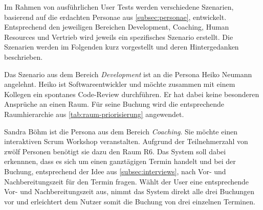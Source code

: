 Im Rahmen von ausführlichen User Tests werden verschiedene Szenarien, basierend auf die erdachten Personae aus \ref{subsec:personae}, entwickelt. Entsprechend den jeweiligen Bereichen Development, Coaching, Human Resources und Vertrieb wird jeweils ein spezifisches Szenario erstellt. Die Szenarien werden im Folgenden kurz vorgestellt und deren Hintergedanken beschrieben.

Das Szenario aus dem Bereich \textit{Development} ist an die Persona Heiko Neumann angelehnt. Heiko ist Softwareentwickler und möchte zusammen mit einem Kollegen ein spontanes Code-Review durchführen. Er hat dabei keine besonderen Ansprüche an einen Raum. Für seine Buchung wird die entsprechende Raumhierarchie aus \ref{tab:raum-priorisierung} \mbox{angewendet}. 


Sandra Böhm ist die Persona aus dem Bereich \textit{Coaching}. Sie möchte einen interaktiven Scrum Workshop veranstalten. Aufgrund der Teilnehmerzahl von zwölf Personen benötigt sie dazu den Raum R6. Das System soll dabei erkennnen, dass es sich um einen ganztägigen Termin handelt und bei der Buchung, entsprechend der Idee aus \ref{subsec:interviews}, nach Vor- und Nachbereitungszeit für den Termin fragen. Wählt der User eine entsprechende Vor- und Nachbereitungszeit aus, nimmt das System direkt alle drei Buchungen vor und erleichtert dem Nutzer somit die Buchung von drei einzelnen Terminen. 

